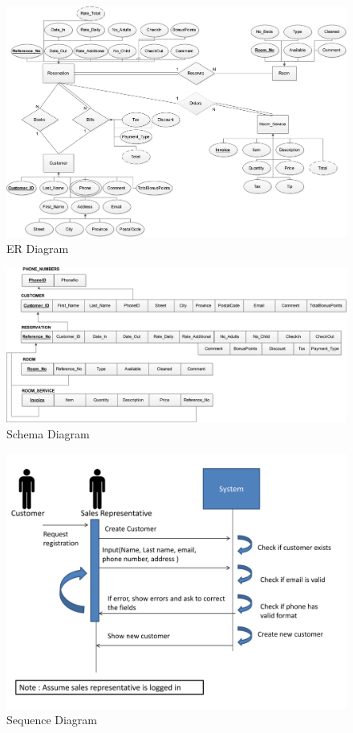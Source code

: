 \begin{figure}[ht]
	\includegraphics[scale=0.8, angle=90]{images/er_diagram}
	\caption{ER Diagram}
\end{figure}
\begin{figure}[ht]
	\includegraphics[scale=0.8, angle=90]{images/schema_diagram}
	\caption{Schema Diagram}
\end{figure}
\begin{figure}[ht]
	\includegraphics[scale=0.7]{images/sequence_diagram}
	\caption{Sequence Diagram}
\end{figure}

